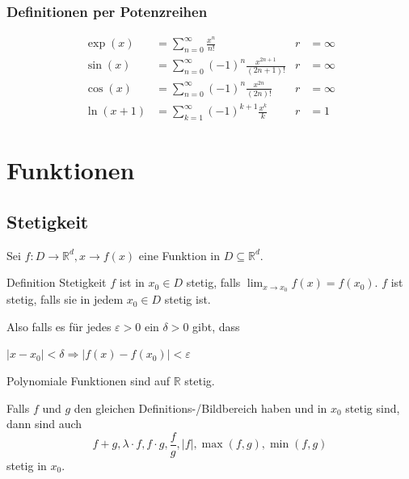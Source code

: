 \documentclass[a4paper,10pt]{article}
\def\sumk{\sum_{k=1}^\infty}
\def\sumn{\sum_{n=0}^\infty}
\def\R{\mathbb{R}}
\begin{document}
\subsubsection{Definitionen per Potenzreihen}
\begin{align*}
	\exp(x)    & = \sumn \frac{x^n}{n!}                      & r & = \infty \\
	\sin(x)    & = \sumn (-1)^n \frac{x^{2n + 1}}{(2n + 1)!} & r & = \infty \\
	\cos(x)    & = \sumn (-1)^n \frac{x^{2n}}{(2n)!}         & r & = \infty \\
	\ln(x + 1) & = \sumk (-1)^{k+1} \frac{x^k}{k}            & r & = 1      
\end{align*}


\section{Funktionen}
\subsection{Stetigkeit}
Sei $f : D \to \R^d, x \to f(x)$ eine Funktion in $D \subseteq \R^d$.
\begin{mainbox}{Definition Stetigkeit}
	$f$ ist in $x_0 \in D$ stetig, falls $\lim_{x\to x_0} f(x) = f(x_0)$.
	$f$ ist stetig, falls sie in jedem $x_0 \in D$ stetig ist.
	 
	Also falls es für jedes $\varepsilon>0$ ein $\delta>0$ gibt, dass
	\centerline{$|x-x_0|<\delta \Rightarrow |f(x) - f(x_0)|<\varepsilon$}
\end{mainbox}
Polynomiale Funktionen sind auf $\R$ stetig.
\begin{subbox}{}
	Falls $f$ und $g$ den gleichen Definitions-/Bildbereich haben und in $x_0$ stetig sind, dann sind auch $$f + g, \lambda \cdot f, f \cdot g, \frac{f}{g}, |f|, \max(f,g), \min(f,g)$$ stetig in $x_0$.
\end{subbox}
\end{document}
